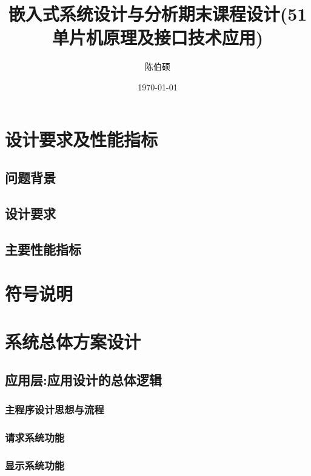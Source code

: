 \documentclass[pdfCover]{myreport} %
\title{嵌入式系统设计与分析期末课程设计(51单片机原理及接口技术应用)}
\author{陈伯硕}
\date{\today}
\begin{document}
\maketitle

\tableofcontents
\newpage

\section{设计要求及性能指标}
  \subsection{问题背景}
    
  \subsection{设计要求}
    
  \subsection{主要性能指标}
    

\section{符号说明}
  

\section{系统总体方案设计}
  \subsection{应用层:应用设计的总体逻辑}
    \subsubsection{主程序设计思想与流程}
      
    \subsubsection{请求系统功能}
      
    \subsubsection{显示系统功能}
      

\end{document}
